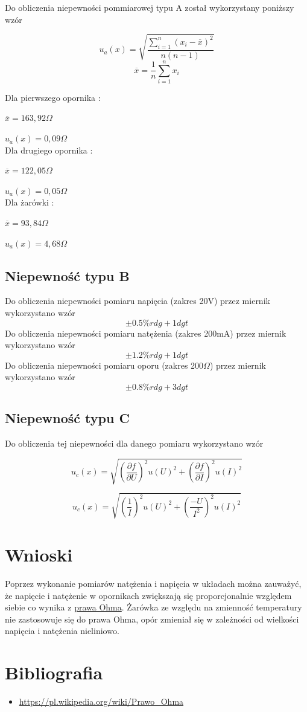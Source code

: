 \documentclass[12pt]{article}
\begin{document}
Do obliczenia niepewności pommiarowej typu A został wykorzystany poniższy wzór

$$ u_a(x) = \sqrt{\frac{\sum\limits_{i=1}^{n}(x_i - \overline{x})^2}{n(n - 1)}} $$
$$ \overline{x} = \frac{1}{n}\sum\limits_{i = 1}^{n}x_i $$

Dla pierwszego opornika : 

$ \overline{x} = 163,92\Omega $

$ u_a(x) = 0,09\Omega $\\

Dla drugiego opornika : 

$ \overline{x} = 122,05\Omega $

$ u_a(x) = 0,05\Omega $\\

Dla żarówki : 

$ \overline{x} = 93,84\Omega $

$ u_a(x) = 4,68\Omega $

\subsection{Niepewność typu B}

Do obliczenia niepewności pomiaru napięcia (zakres 20V) przez miernik wykorzystano wzór
$$ \pm 0.5\% rdg + 1dgt  $$
Do obliczenia niepewności pomiaru natężenia (zakres 200mA) przez miernik wykorzystano wzór
$$ \pm 1.2\% rdg + 1dgt  $$
Do obliczenia niepewności pomiaru oporu (zakres 200$\Omega$) przez miernik wykorzystano wzór
$$ \pm 0.8\% rdg + 3dgt  $$

\subsection{Niepewność typu C}

Do obliczenia tej niepewności dla danego pomiaru wykorzystano wzór

$$ u_c(x) = \sqrt{(\frac{\partial f}{\partial U})^2 u(U)^2 + (\frac{\partial f}{\partial I})^2 u(I)^2 } $$

$$ u_c(x) = \sqrt{(\frac{1}{I})^2 u(U)^2 + (\frac{-U}{I^2})^2 u(I)^2 } $$

\section{Wnioski}
Poprzez wykonanie pomiarów natężenia i napięcia w układach można zauważyć, że napięcie i natężenie
w opornikach
zwiększają się proporcjonalnie względem siebie co wynika z \hyperlink{ohm}{prawa Ohma}.
Żarówka ze względu na zmienność temperatury nie zastosowuje się do prawa Ohma, opór zmieniał się 
w zależności od wielkości napięcia i natężenia nieliniowo.

\section{Bibliografia}
\begin{itemize}
    \item \url{https://pl.wikipedia.org/wiki/Prawo_Ohma}
\end{itemize}
\end{document}
